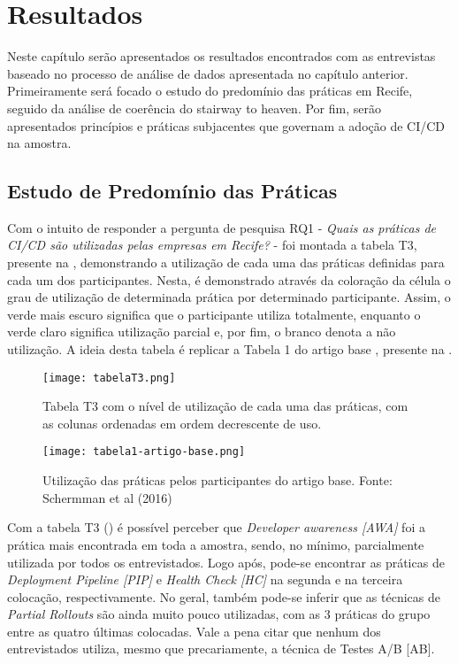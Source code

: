 
\chapter{Resultados}

Neste capítulo serão apresentados os resultados encontrados com as entrevistas baseado no processo de análise de dados apresentada no capítulo anterior. Primeiramente será focado o estudo do predomínio das práticas em Recife, seguido da análise de coerência do stairway to heaven. Por fim, serão apresentados princípios e práticas subjacentes que governam a adoção de CI/CD na amostra.

\section{Estudo de Predomínio das Práticas}

Com o intuito de responder a pergunta de pesquisa RQ1 - \emph{Quais as práticas de CI/CD são utilizadas pelas empresas em Recife?} - foi montada a tabela T3, presente na , demonstrando a utilização de cada uma das práticas definidas para cada um dos participantes. Nesta, é demonstrado através da coloração da célula o grau de utilização de determinada prática por determinado participante. Assim, o verde mais escuro significa que o participante utiliza totalmente, enquanto o verde claro significa utilização parcial e, por fim, o branco denota a não utilização. A ideia desta tabela é replicar a Tabela 1 do artigo base \cite{empiricalStudy2016}, presente na .

\begin{figure}[ht]
\begin{center}
\texttt{[image: tabelaT3.png]}
\end{center}
\caption[Tabela T3]{
    Tabela T3 com o nível de utilização de cada uma das práticas, com as colunas ordenadas em ordem decrescente de uso.
}\label{tabela_t3}
\end{figure}

\begin{figure}[ht]
\begin{center}
\texttt{[image: tabela1-artigo-base.png]}
\end{center}
\caption[Tabela 1 do artigo base]{
    Utilização das práticas pelos participantes do artigo base.
    Fonte: Schermman et al (2016)
}\label{tabela_1_artigo_base}
\end{figure}

Com a tabela T3 () é possível perceber que \emph{Developer awareness [AWA]} foi a prática mais encontrada em toda a amostra, sendo, no mínimo, parcialmente utilizada por todos os entrevistados. Logo após, pode-se encontrar as práticas de \emph{Deployment Pipeline [PIP]} e \emph{Health Check [HC]} na segunda e na terceira colocação, respectivamente. No geral, também pode-se inferir que as técnicas de \emph{Partial Rollouts} são ainda muito pouco utilizadas, com as 3 práticas do grupo entre as quatro últimas colocadas. Vale a pena citar que nenhum dos entrevistados utiliza, mesmo que precariamente, a técnica de Testes A/B [AB].

